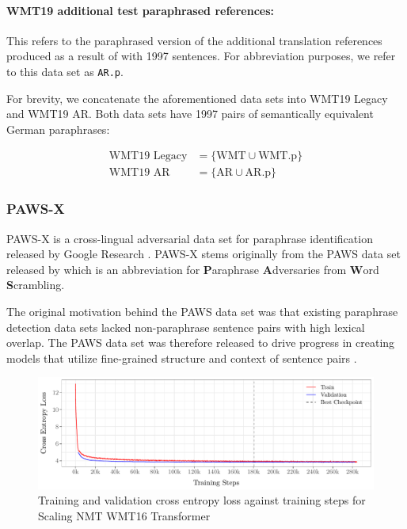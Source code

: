 \documentclass[11pt,a4paper]{article}
\begin{document}
\paragraph{WMT19 additional test paraphrased references:}This refers to the paraphrased version of the additional translation references produced as a result of \citet{freitag-bleu-paraphrase-references-2020} with 1997 sentences. For abbreviation purposes, we refer to this data set as \texttt{AR.p}.

For brevity, we concatenate the aforementioned data sets into WMT19 Legacy and WMT19 AR. Both data sets have 1997 pairs of semantically equivalent German paraphrases:

\vspace{-10pt}
\begin{align}
  \text{WMT19 Legacy} &= \{\text{WMT} \cup \text{WMT.p} \} \label{wmt19legacy} \\
  \text{WMT19 AR} &= \{\text{AR} \cup \text{AR.p} \} \label{wmt19ar}
\end{align}

\subsubsection{PAWS-X}

PAWS-X is a cross-lingual adversarial data set for paraphrase identification released by Google Research \citep{pawsx2019emnlp}. PAWS-X stems originally from the PAWS data set released by \citet{zhang2019paws} which is an abbreviation for \textbf{P}araphrase \textbf{A}dversaries from \textbf{W}ord \textbf{S}crambling.

The original motivation behind the PAWS data set was that existing paraphrase detection data sets lacked non-paraphrase sentence pairs with high lexical overlap. The PAWS data set was therefore released to drive progress in creating models that utilize fine-grained structure and context of sentence pairs \cite{zhang2019paws}. 

\begin{figure}
  \centering 
  \includegraphics[trim={0cm 0cm 0cm 0cm},clip,width=\textwidth]{transformer_nmt_evolution.pdf}
  \caption{Training and validation cross entropy loss against training steps for Scaling NMT WMT16 Transformer}
  \label{transformer_nmt_evolution}
\end{figure}
\end{document}
